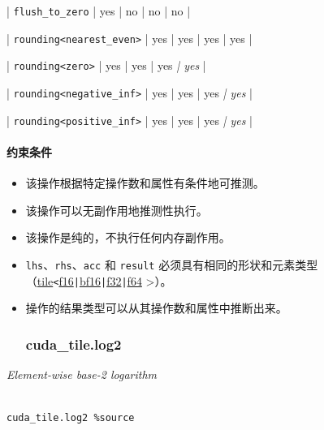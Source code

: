 \documentclass{article}
\begin{document}
| \texttt{flush\_to\_zero} | yes | no | no | no |


| \texttt{rounding<nearest\_even>} | yes | yes | yes | yes |


| \texttt{rounding<zero>} | yes | yes | yes\textit{ | yes} |


| \texttt{rounding<negative\_inf>} | yes | yes | yes\textit{ | yes} |


| \texttt{rounding<positive\_inf>} | yes | yes | yes\textit{ | yes} |






\paragraph{约束条件}


\begin{itemize}
\item 该操作根据特定操作数和属性有条件地可推测。
\item 该操作可以无副作用地推测性执行。
\item 该操作是纯的，不执行任何内存副作用。
\item \texttt{lhs}、\texttt{rhs}、\texttt{acc} 和 \texttt{result} 必须具有相同的形状和元素类型（\href{https://docs.nvidia.com/cuda/tile-ir/latest/sections/types.html#type-tile}{tile}\texttt{<}\href{https://docs.nvidia.com/cuda/tile-ir/latest/sections/types.html#subsection-element-types}{f16}\texttt{|}\href{https://docs.nvidia.com/cuda/tile-ir/latest/sections/types.html#subsection-element-types}{bf16}\texttt{|}\href{https://docs.nvidia.com/cuda/tile-ir/latest/sections/types.html#subsection-element-types}{f32}\texttt{|}\href{https://docs.nvidia.com/cuda/tile-ir/latest/sections/types.html#subsection-element-types}{f64} >）。
\item 操作的结果类型可以从其操作数和属性中推断出来。




\subsubsection{cuda\_tile.log2}


\end{itemize}
\textit{Element-wise base-2 logarithm}




\begin{lstlisting}

cuda_tile.log2 %source

\end{lstlisting}
\end{document}
